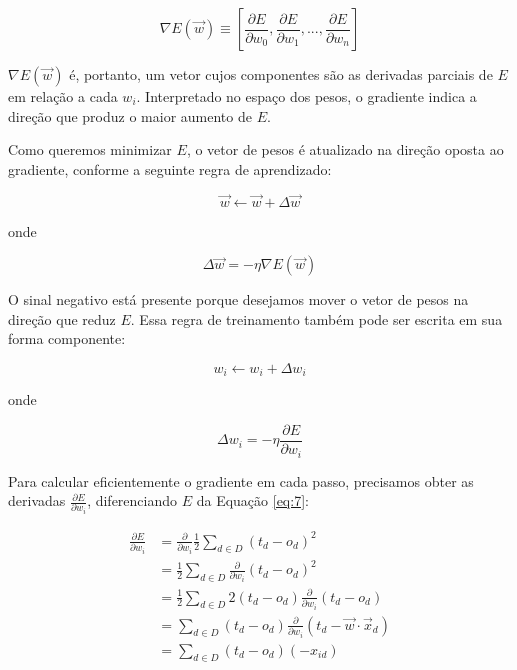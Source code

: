 \documentclass{article}
\begin{document}
\begin{equation}
\nabla E(\Vec{w}) \equiv
\left[ \frac{\partial E}{\partial w_0}, \frac{\partial E}{\partial w_1}, ..., \frac{\partial E}{\partial w_n} \right]
\end{equation}

$\nabla E(\Vec{w})$ é, portanto, um vetor cujos componentes são as derivadas parciais de $E$ em relação a cada $w_i$. Interpretado no espaço dos pesos, o gradiente indica a direção que produz o maior aumento de $E$.

Como queremos minimizar $E$, o vetor de pesos é atualizado na direção oposta ao gradiente, conforme a seguinte regra de aprendizado:

\begin{equation}
\Vec{w} \leftarrow \Vec{w} + \Delta \Vec{w}
\end{equation}

onde

\begin{equation}
\Delta \Vec{w} = - \eta \nabla E(\Vec{w})
\end{equation}

O sinal negativo está presente porque desejamos mover o vetor de pesos na direção que reduz $E$. Essa regra de treinamento também pode ser escrita em sua forma componente:

\begin{equation}
w_i \leftarrow w_i + \Delta w_i
\end{equation}

onde

\begin{equation}
\Delta w_i = -\eta\frac{\partial E}{\partial w_i}
\end{equation}

Para calcular eficientemente o gradiente em cada passo, precisamos obter as derivadas $\frac{\partial E}{\partial w_i}$, diferenciando $E$ da Equação \ref{eq:7}:

\begin{equation}
    \begin{split}
        \frac{\partial E}{\partial w_i} &= \frac{\partial}{\partial w_i} \frac{1}{2} \sum_{d \in D} (t_d - o_d)^2 \\
        &= \frac{1}{2} \sum_{d \in D} \frac{\partial}{\partial w_i} (t_d - o_d)^2 \\
        &= \frac{1}{2} \sum_{d \in D} 2 (t_d - o_d) \frac{\partial}{\partial w_i} (t_d - o_d) \\
        &= \sum_{d \in D} (t_d - o_d) \frac{\partial}{\partial w_i} (t_d - \vec{w} \cdot \vec{x}_d) \\
        &= \sum_{d \in D} (t_d - o_d)(-x_{id})
    \end{split}
\end{equation}
\end{document}

